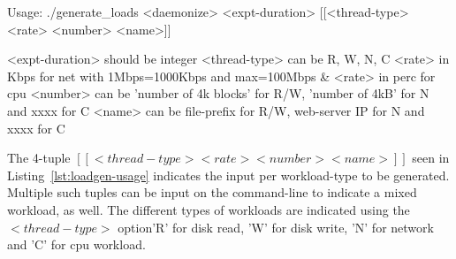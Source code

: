 \begin{snippet}
Usage: ./generate_loads <daemonize> <expt-duration> [[<thread-type> <rate> <number> <name>]]

<expt-duration> should be integer
<thread-type> can be R, W, N, C
<rate> in Kbps for net with 1Mbps=1000Kbps and max=100Mbps & <rate> in perc for cpu
<number> can be 'number of 4k blocks' for R/W, 'number of 4kB' for N and xxxx for C
<name> can be file-prefix for R/W, web-server IP for N and xxxx for C
\end{snippet}

The 4-tuple $[[<thread-type> <rate> <number> <name>]]$ seen in Listing~\ref{lst:loadgen-usage}
indicates the input per workload-type to be generated. Multiple such tuples can be input
on the command-line to indicate a mixed workload, as well. The different types of workloads
are indicated using the $<thread-type>$ option\textemdash{}'R' for disk read, 'W' for disk write, 
'N' for network and 'C' for cpu workload. 
